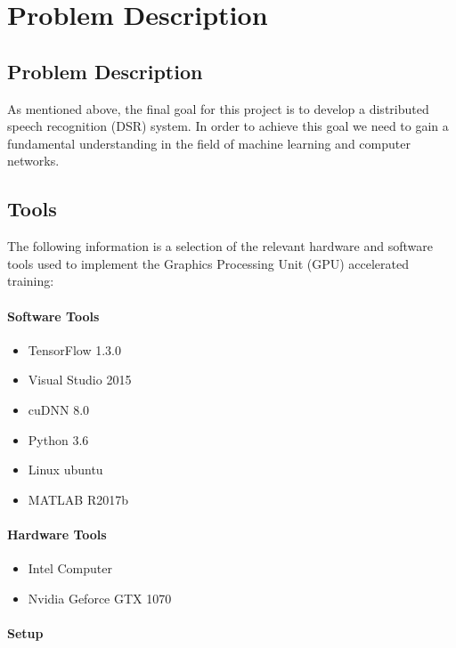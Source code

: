 \chapter{Problem Description}\label{ch:problem_description}
\section{Problem Description}

As mentioned above, the final goal for this project is to develop a distributed speech recognition (DSR) system.
In order to achieve this goal we need to gain a fundamental understanding in the field of machine learning and computer networks.

\section{Tools}
The following information is a selection of the relevant hardware and software tools used to implement the Graphics Processing Unit (GPU) accelerated training:
\subsubsection{Software Tools}
\begin{itemize}
	\item TensorFlow 1.3.0
	\item Visual Studio 2015
	\item cuDNN 8.0
	\item Python 3.6
	\item Linux ubuntu
	\item MATLAB  R2017b
\end{itemize}

\subsubsection{Hardware Tools}
\begin{itemize}
	\item Intel Computer
	\item Nvidia Geforce GTX 1070 
\end{itemize}

\subsubsection{Setup}

